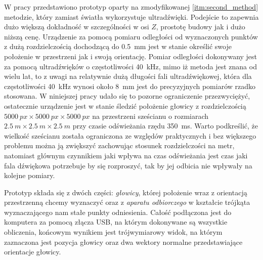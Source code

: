  W pracy przedstawiono prototyp oparty na zmodyfikowanej \ref{itm:second_method}
 metodzie, który zamiast światła wykorzystuje ultradźwięki. Podejście to zapewnia dużo większą
 dokładność w szczególności w osi $Z$, prostotę budowy jak i dużo niższą cenę.
 Urządzenie za pomocą pomiaru odległości od wyznaczonych punktów
z dużą rozdzielczością dochodzącą do \SI{0.5}{mm} jest w stanie określić swoje położenie
w przestrzeni jak i swoją orientację. 
Pomiar odległości dokonywany jest za pomocą ultradźwięków o częstotliwości \SI{40}{kHz},
mimo iż metoda jest znana od wielu lat, to z uwagi na relatywnie dużą długości fali ultradźwiękowej,
która dla częstotliwości \SI{40}{kHz} wynosi około \SI{8}{mm} jest do precyzyjnych pomiarów rzadko stosowana.
W niniejszej pracy udało się to pozorne ograniczenie przezwyciężyć,
ostatecznie urządzenie jest w stanie śledzić położenie głowicy z rozdzielczością 
$\SI{5000}{px} \times \SI{5000}{px} \times \SI{5000}{px}$ na przestrzeni sześcianu o rozmiarach 
$\SI{2.5}{m} \times \SI{2.5}{m}  \times \SI{2.5}{m} $ przy czasie odświeżania rzędu \SI{350}{ms}.
Warto podkreślić, że wielkość sześcianu została ograniczona ze względów praktycznych i bez 
większego problemu można ją zwiększyć zachowując stosunek rozdzielczości na metr,
natomiast głównym czynnikiem jaki wpływa na czas odświeżania jest czas jaki fala dźwiękowa potrzebuje
by się rozproszyć, tak by jej odbicia nie wpływały na kolejne pomiary.

Prototyp składa się z dwóch części: \textit{głowicy}, której położenie wraz z orientacją przestrzenną chcemy wyznaczyć
oraz z \textit{aparatu odbiorczego} w kształcie trójkąta wyznaczającego nam stałe punkty odniesienia.
Całość  podłączona jest do komputera za pomocą złącza USB, na którym dokonywane są wszystkie obliczenia,
końcowym wynikiem jest trójwymiarowy widok, na którym zaznaczona jest pozycja głowicy oraz dwa wektory normalne
przedstawiające orientacje głowicy.




   